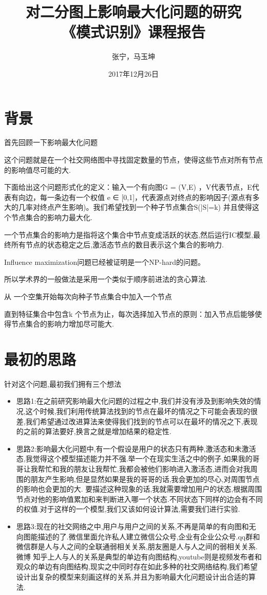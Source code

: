\documentclass[11pt, a4paper]{article}
\begin{document}
\title{\textbf{对二分图上影响最大化问题的研究}\\《模式识别》课程报告}
  \author{张宁，马玉坤}
  \date{2017年12月26日}
  \maketitle
  \section{背景}
  首先回顾一下影响最大化问题

  这个问题就是在一个社交网络图中寻找固定数量的节点，使得这些节点对所有节点的影响值尽可能的大.

  下面给出这个问题形式化的定义：输入一个有向图G = (V,E) ，V代表节点，E代表有向边，每一条边有一个权值 e ∈ [0,1]，代表源点对终点的影响因子(源点有多大的几率对终点产生影响)。我们希望找到一个种子节点集合S(|S|=k) 并且使得这个节点集合的影响力最大化.

  一个节点集合的影响力是指将这个集合中节点变成活跃的状态,然后运行IC模型,最终所有节点的状态稳定之后,激活态节点的数目表示这个集合的影响力.

  Influence maximization问题已经被证明是一个NP-hard的问题。

  所以学术界的一般做法是采用一个类似于顺序前进法的贪心算法.

  从 一个空集开始每次向种子节点集合中加入一个节点

  直到特征集合中包含k 个节点为止，每次选择加入节点的原则：加入节点后能够使得节点集合的影响力增加尽可能大.


  \section{最初的思路}
  针对这个问题,最初我们拥有三个想法

  \begin{itemize}
  \item 思路1:在之前研究影响最大化问题的过程之中,我们并没有涉及到影响失效的情况,这个时候,我们利用传统算法找到的节点在最坏的情况之下可能会表现的很差,我们希望通过改进算法来使得我们找到的节点可以在最坏的情况之下,表现的之前的算法要好,换言之就是增加结果的稳定性.
  \item 思路2:影响最大化问题中,有一个假设是用户的状态只有两种,激活态和未激活态,我觉得这个模型描述能力并不强.举一个在现实生活之中的例子,如果我的哥哥让我帮忙和我的朋友让我帮忙,我都会被他们影响进入激活态,进而会对我周围的朋友产生影响,但是显然如果是我的哥哥的话,我会更加的尽心,对周围节点的影响也会更加的大. 要描述这种现象的话,我就需要增加用户的状态,根据周围节点对他的影响值累加和来判断进入哪一个状态.不同状态下同样的边会有不同的权值.对于这样的一个模型,我们又该如何设计算法,需要我们进行实验.
  \item 思路3:现在的社交网络之中,用户与用户之间的关系,不再是简单的有向图和无向图能描述的了.微信里面允许私人建立微信公众号,企业有企业公众号.qq群和微信群是人与人之间的全联通弱相关关系,朋友圈是人与人之间的弱相关关系.微博 知乎上人与人的关系是典型的单边有向图结构,youtube则是视频发布者和观众的单边有向图结构,现实之中同时存在如此多种的社交网络结构,我们希望设计出复杂的模型来刻画这样的关系,并且为影响最大化问题设计出合适的算法.
  \end{itemize}
\end{document}

